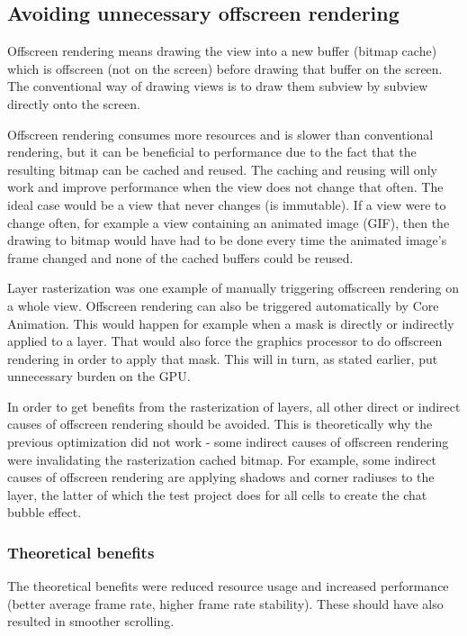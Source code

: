 \documentclass[a4paper,12pt]{article}
\begin{document}
\subsection{Avoiding unnecessary offscreen rendering}
Offscreen rendering means drawing the view into a new buffer (bitmap cache) which is offscreen (not on the screen) before drawing that buffer on the screen. The conventional way of drawing views is to draw them subview by subview directly onto the screen.\cite{MovingPixelsOntoTheScreen}

Offscreen rendering consumes more resources and is slower than conventional rendering, but it can be beneficial to performance due to the fact that the resulting bitmap can be cached and reused. The caching and reusing will only work and improve performance when the view does not change that often. The ideal case would be a view that never changes (is immutable). If a view were to change often, for example a view containing an animated image (GIF), then the drawing to bitmap would have had to be done every time the animated image's frame changed and none of the cached buffers could be reused.

Layer rasterization was one example of manually triggering offscreen rendering on a whole view. Offscreen rendering can also be triggered automatically by Core Animation. This would happen for example when a mask is directly or indirectly applied to a layer. That would also force the graphics processor to do offscreen rendering in order to apply that mask. This will in turn, as stated earlier, put unnecessary burden on the GPU.\cite{MovingPixelsOntoTheScreen}

In order to get benefits from the rasterization of layers, all other direct or indirect causes of offscreen rendering should be avoided. This is theoretically why the previous optimization did not work - some indirect causes of offscreen rendering were invalidating the rasterization cached bitmap. For example, some indirect causes of offscreen rendering are applying shadows and corner radiuses to the layer, the latter of which the test project does for all cells to create the chat bubble effect.\cite{MovingPixelsOntoTheScreen}

\subsubsection*{Theoretical benefits}
The theoretical benefits were reduced resource usage and increased performance (better average frame rate, higher frame rate stability). These should have also resulted in smoother scrolling.
\end{document}
